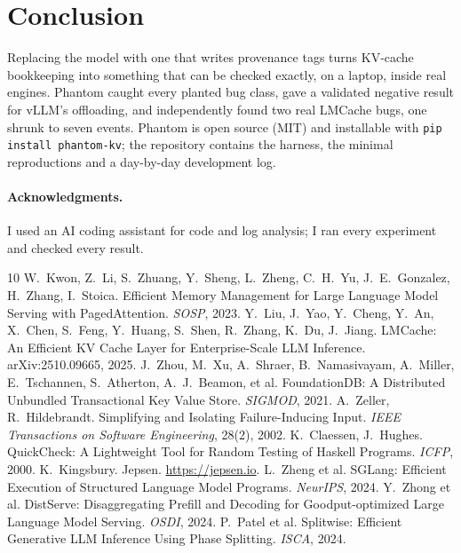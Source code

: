 \documentclass[10pt]{article}
\newcommand{\code}[1]{\texttt{\small #1}}
\begin{document}
\section{Conclusion}
Replacing the model with one that writes provenance tags turns KV-cache
bookkeeping into something that can be checked exactly, on a laptop, inside
real engines. Phantom caught every planted bug class, gave a validated
negative result for vLLM's offloading, and independently found two real
LMCache bugs, one shrunk to seven events. Phantom is open source (MIT) and
installable with \code{pip install phantom-kv}; the repository contains the
harness, the minimal reproductions and a day-by-day development log.

\paragraph{Acknowledgments.} I used an AI coding assistant for code and log
analysis; I ran every experiment and checked every result.

\begin{thebibliography}{10}\small
{} W.~Kwon, Z.~Li, S.~Zhuang, Y.~Sheng, L.~Zheng, C.~H.~Yu,
J.~E.~Gonzalez, H.~Zhang, I.~Stoica. Efficient Memory Management for Large
Language Model Serving with PagedAttention. \emph{SOSP}, 2023.
 Y.~Liu, J.~Yao, Y.~Cheng, Y.~An, X.~Chen, S.~Feng,
Y.~Huang, S.~Shen, R.~Zhang, K.~Du, J.~Jiang. LMCache: An Efficient KV Cache
Layer for Enterprise-Scale LLM Inference. arXiv:2510.09665, 2025.
 J.~Zhou, M.~Xu, A.~Shraer, B.~Namasivayam, A.~Miller,
E.~Tschannen, S.~Atherton, A.~J.~Beamon, et al. FoundationDB: A Distributed
Unbundled Transactional Key Value Store. \emph{SIGMOD}, 2021.
 A.~Zeller, R.~Hildebrandt. Simplifying and Isolating
Failure-Inducing Input. \emph{IEEE Transactions on Software Engineering},
28(2), 2002.
 K.~Claessen, J.~Hughes. QuickCheck: A
Lightweight Tool for Random Testing of Haskell Programs. \emph{ICFP}, 2000.
 K.~Kingsbury. Jepsen. \url{https://jepsen.io}.
 L.~Zheng et al. SGLang: Efficient Execution of
Structured Language Model Programs. \emph{NeurIPS}, 2024.
 Y.~Zhong et al. DistServe: Disaggregating
Prefill and Decoding for Goodput-optimized Large Language Model Serving.
\emph{OSDI}, 2024.
 P.~Patel et al. Splitwise: Efficient Generative
LLM Inference Using Phase Splitting. \emph{ISCA}, 2024.
\end{thebibliography}
\end{document}

